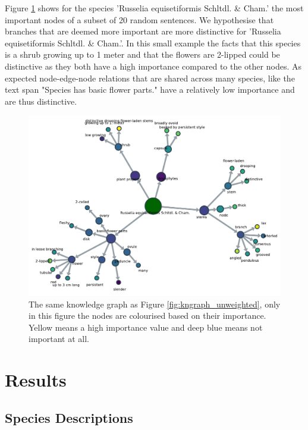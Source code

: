 \documentclass[a4paper, 12pt, oneside]{book} %
\begin{document}
Figure \ref{fig:kngraph_weighted} shows for the species 'Russelia equisetiformis Schltdl. \& Cham.' the most important nodes of a subset of 20 random sentences.
We hypothesise that branches that are deemed more important are more distinctive for 'Russelia equisetiformis Schltdl. \& Cham.'.
In this small example the facts that this species is a shrub growing up to 1 meter and that the flowers are 2-lipped could be distinctive as they both have a high importance compared to the other nodes.
As expected node-edge-node relations that are shared across many species, like the text span "Species has basic flower parts." have a relatively low importance and are thus distinctive. 


\begin{figure} [htpb]
    \centering
    \includegraphics[width=\textwidth]{figures/kngraph_weighted.pdf}
    \caption[Example of an weighted knowledge graph]{The same knowledge graph as Figure \ref{fig:kngraph_unweighted}, only in this figure the nodes are colourised based on their importance. Yellow means a high importance value and deep blue means not important at all.}
    \label{fig:kngraph_weighted}
\end{figure}

\newpage
\section{Results} \label{par:results}
\subsection{Species Descriptions}
\end{document}
